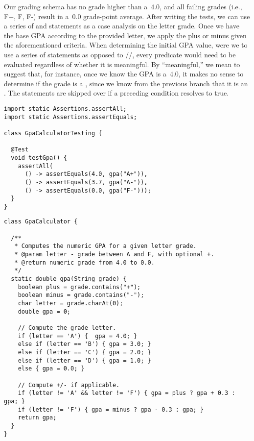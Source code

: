 Our grading schema has no grade higher than a~$4.0$, and all failing grades (i.e., F+, F, F-) result in a~$0.0$ grade-point average. 
After writing the tests, we can use a series of  and  statements as a case analysis on the letter grade. 
Once we have the base GPA according to the provided letter, we apply the plus or minus given the aforementioned criteria. 
When determining the initial GPA value, were we to use a series of  statements as opposed to //, every predicate would need to be evaluated regardless of whether it is meaningful. 
By ``meaningful,'' we mean to suggest that, for instance, once we know the GPA is a~$4.0$, it makes no sense to determine if the grade is a , since we know from the previous branch that it is an . 
The  statements are skipped over if a preceding condition resolves to true.

\begin{lstlisting}[language=MyJava]
import static Assertions.assertAll;
import static Assertions.assertEquals;

class GpaCalculatorTesting {

  @Test
  void testGpa() {
    assertAll(
      () -> assertEquals(4.0, gpa("A+")),
      () -> assertEquals(3.7, gpa("A-")),
      () -> assertEquals(0.0, gpa("F-")));
  }
}
\end{lstlisting}

\begin{lstlisting}[language=MyJava]
class GpaCalculator {

  /**
   * Computes the numeric GPA for a given letter grade.
   * @param letter - grade between A and F, with optional +.
   * @return numeric grade from 4.0 to 0.0.
   */
  static double gpa(String grade) {
    boolean plus = grade.contains("+");
    boolean minus = grade.contains("-");
    char letter = grade.charAt(0);
    double gpa = 0;
    
    // Compute the grade letter.
    if (letter == 'A') {  gpa = 4.0; } 
    else if (letter == 'B') { gpa = 3.0; } 
    else if (letter == 'C') { gpa = 2.0; } 
    else if (letter == 'D') { gpa = 1.0; } 
    else { gpa = 0.0; }
    
    // Compute +/- if applicable.
    if (letter != 'A' && letter != 'F') { gpa = plus ? gpa + 0.3 : gpa; }
    if (letter != 'F') { gpa = minus ? gpa - 0.3 : gpa; }
    return gpa;
  }
}
\end{lstlisting}

